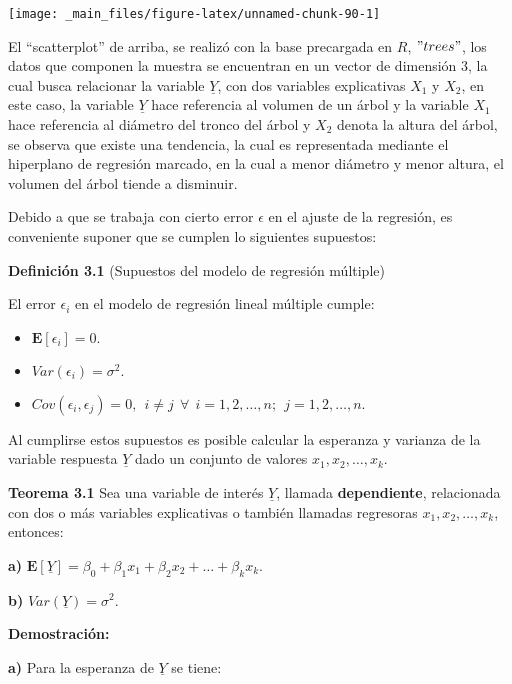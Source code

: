 \documentclass[a4paper,oneside,openany]{book}
\begin{document}
\begin{center}\texttt{[image: \_main\_files/figure-latex/unnamed-chunk-90-1]} \end{center}

El ``scatterplot'' de arriba, se realizó con la base precargada en
\(R\), \("trees"\), los datos que componen la muestra se encuentran en
un vector de dimensión 3, la cual busca relacionar la variable
\(\underline{Y}\), con dos variables explicativas \(X_{1}\) y \(X_{2}\),
en este caso, la variable \(\underline{Y}\) hace referencia al volumen
de un árbol y la variable \(X_{1}\) hace referencia al diámetro del
tronco del árbol y \(X_{2}\) denota la altura del árbol, se observa que
existe una tendencia, la cual es representada mediante el hiperplano de
regresión marcado, en la cual a menor diámetro y menor altura, el
volumen del árbol tiende a disminuir.

Debido a que se trabaja con cierto error \(\epsilon\) en el ajuste de la
regresión, es conveniente suponer que se cumplen lo siguientes
supuestos:

\textbf{Definición 3.1} (Supuestos del modelo de regresión múltiple)

El error \(\epsilon_{i}\) en el modelo de regresión lineal múltiple
cumple:

\begin{itemize}
\item
  \(\mathbf{E}[\epsilon_{i}]=0.\)
\item
  \(Var(\epsilon_{i})=\sigma^2.\)
\item
  \(Cov(\epsilon_{i},\epsilon_{j})=0, \ \ i \neq j \ \ \forall \ \ i= 1,2,\ldots,n; \ \ j= 1,2,\ldots,n.\)
\end{itemize}

Al cumplirse estos supuestos es posible calcular la esperanza y varianza
de la variable respuesta \(\underline{Y}\) dado un conjunto de valores
\(x_{1},x_{2},\ldots,x_{k}.\)

\textbf{Teorema 3.1} Sea una variable de interés \(\underline{Y}\),
llamada \textbf{dependiente}, relacionada con dos o más variables
explicativas o también llamadas regresoras \(x_{1},x_{2},\ldots,x_{k}\),
entonces:

\textbf{a)}
\(\mathbf{E}[\underline{Y}]= \beta_{0}+\beta_{1}x_{1}+\beta_{2}x_{2}+ \ldots + \beta_{k}x_{k}.\)

\textbf{b)} \(Var(\underline{Y})= \sigma^2.\)

\textbf{Demostración:}

\textbf{a)} Para la esperanza de \(\underline{Y}\) se tiene:
\end{document}
